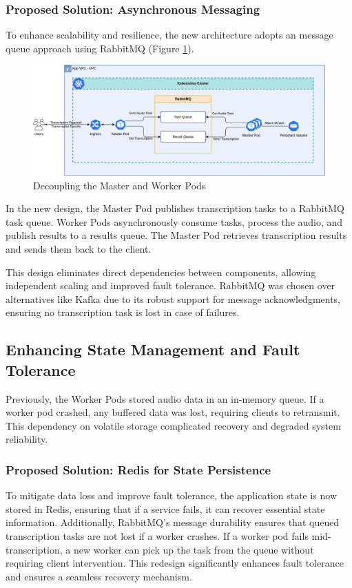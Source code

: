 \subsubsection{Proposed Solution: Asynchronous Messaging}
To enhance scalability and resilience, the new architecture adopts an message queue approach using RabbitMQ (Figure \ref{fig:decouple}).
\begin{figure}[!ht]
    \centering
    \includegraphics[width=\textwidth]{figures/decouple.drawio.png}
    \caption{Decoupling the Master and Worker Pods}
    \label{fig:decouple}
\end{figure}

In the new design, the Master Pod publishes transcription tasks to a RabbitMQ task queue. Worker Pods asynchronously consume tasks, process the audio, and publish results to a results queue. The Master Pod retrieves transcription results and sends them back to the client.

This design eliminates direct dependencies between components, allowing independent scaling and improved fault tolerance. RabbitMQ was chosen over alternatives like Kafka due to its robust support for message acknowledgments, ensuring no transcription task is lost in case of failures.

\subsection{Enhancing State Management and Fault Tolerance}
Previously, the Worker Pods stored audio data in an in-memory queue. If a worker pod crashed, any buffered data was lost, requiring clients to retransmit. This dependency on volatile storage complicated recovery and degraded system reliability.

\subsubsection{Proposed Solution: Redis for State Persistence}
To mitigate data loss and improve fault tolerance, the application state is now stored in Redis, ensuring that if a service fails, it can recover essential state information. Additionally, RabbitMQ’s message durability ensures that queued transcription tasks are not lost if a worker crashes. If a worker pod fails mid-transcription, a new worker can pick up the task from the queue without requiring client intervention. This redesign significantly enhances fault tolerance and ensures a seamless recovery mechanism.

